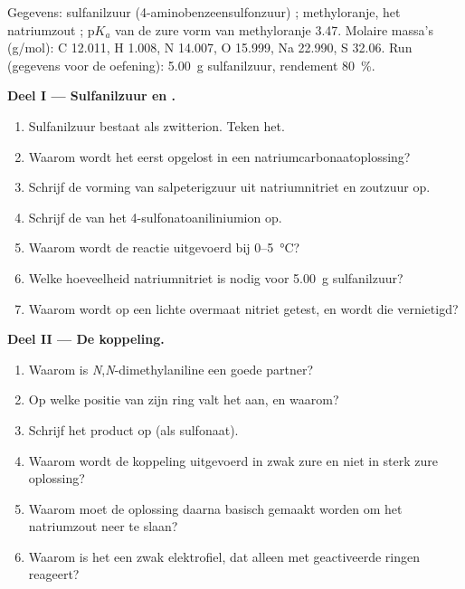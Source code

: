 \begin{problem}
\label{pb:b2:amines:1}
Gegevens: sulfanilzuur (4-aminobenzeensulfonzuur) ; methyloranje, het natriumzout
; $\mathrm pK_a$ van de zure vorm van methyloranje 3.47. Molaire massa's
(\unit{g/mol}): C 12.011, H 1.008, N 14.007, O 15.999, Na 22.990, S 32.06. Run (gegevens voor de oefening):
\qty{5.00}{g} sulfanilzuur, rendement 80~\%.

\medskip
\noindent\textbf{Deel I --- Sulfanilzuur en .}
\begin{enumerate}
  \item Sulfanilzuur bestaat als zwitterion. Teken het.
  \item Waarom wordt het eerst opgelost in een natriumcarbonaatoplossing?
  \item Schrijf de vorming van salpeterigzuur uit natriumnitriet en zoutzuur op.
  \item Schrijf de  van het 4-sulfonatoaniliniumion op.
  \item Waarom wordt de reactie uitgevoerd bij 0--\qty{5}{\degreeCelsius}?
  \item Welke hoeveelheid natriumnitriet is nodig voor \qty{5.00}{g} sulfanilzuur?
  \item Waarom wordt op een lichte overmaat nitriet getest, en wordt die vernietigd?
\end{enumerate}

\medskip
\noindent\textbf{Deel II --- De koppeling.}
\begin{enumerate}[resume]
  \item Waarom is \textit{N},\textit{N}-dimethylaniline een goede partner?
  \item Op welke positie van zijn ring valt het  aan, en waarom?
  \item Schrijf het product op (als sulfonaat).
  \item Waarom wordt de koppeling uitgevoerd in zwak zure en niet in sterk zure oplossing?
  \item Waarom moet de oplossing daarna basisch gemaakt worden om het natriumzout neer te slaan?
  \item Waarom is het  een zwak elektrofiel, dat alleen met geactiveerde ringen reageert?
\end{enumerate}


\end{problem}
